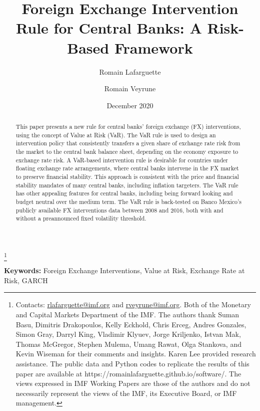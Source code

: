 \documentclass[11pt]{article}
\title{\textbf{Foreign Exchange Intervention Rule for Central Banks:
A Risk-Based Framework}}
\author{Romain Lafarguette}
\author{Romain Veyrune}
\affil{International Monetary Fund}
\date{December 2020}
\newcommand\blfootnote[1]{%
  \begingroup
  \renewcommand\thefootnote{}\footnote{#1}%
  \addtocounter{footnote}{-1}%
  \endgroup
}
\begin{document}
\maketitle      \blfootnote{Contacts:      \url{rlafarguette@imf.org}      and
\url{rveyrune@imf.org}. Both of the Monetary and Capital Markets Department of
the IMF.  The authors thank  Suman Basu, Dimitris Drakopoulos,  Kelly Eckhold,
Chris Erceg, Andres Gonzales, Simon  Gray, Darryl King, Vladimir Klyuev, Jorge
Kriljenko,  Istvan Mak,  Thomas McGregor,  Stephen Mulema,  Umang Rawat,  Olga
Stankova,  and  Kevin Wiseman  for  their  comments  and insights.  Karen  Lee
provided research  assistance. The public  data and Python codes  to replicate
the      results      of      this       paper      are      available      at
https://romainlafarguette.github.io/software/.  The  views  expressed  in  IMF
Working Papers are those of the authors and do not necessarily represent the
views of the IMF, its Executive Board, or IMF management.}


\begin{abstract} This  paper presents  a new rule  for central  banks’ foreign
exchange (FX) interventions, using the concept of Value at Risk (VaR). The VaR
rule is  used to design an  intervention policy that consistently  transfers a
given share of exchange rate risk from  the market to the central bank balance
sheet, depending  on the economy exposure  to exchange rate risk.  A VaR-based
intervention  rule is  desirable for  countries under  floating exchange  rate
arrangements,  where central  banks intervene  in  the FX  market to  preserve
financial stability. This approach is  consistent with the price and financial
stability mandates of  many central banks, including  inflation targeters. The
VaR  rule has  other appealing  features  for central  banks, including  being
forward  looking and  budget neutral  over the  medium term.  The VaR  rule is
back-tested on Banco Mexico’s publicly available FX interventions data between
2008  and  2016,  both  with  and  without  a  preannounced  fixed  volatility
threshold.\\
\end{abstract}
\bigskip

\noindent \textbf{Keywords:} Foreign Exchange Interventions, Value at Risk, Exchange Rate at Risk, GARCH 
\end{document}
